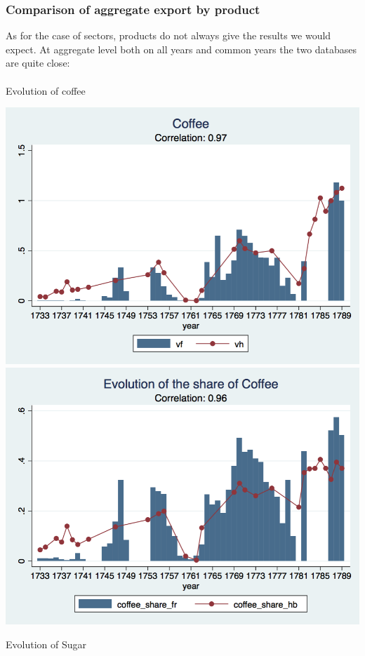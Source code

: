\documentclass[12pt,a4paper,titlepage,english]{article}
\begin{document}
\subsubsection{Comparison of aggregate export by product}
As for the case of sectors, products do not always give the results we would expect. At aggregate level both on all years and common years the two databases are quite close:\\~\\
\caption{Evolution of coffee}
\includegraphics[scale=.28]{coffee_long.png}
\includegraphics[scale=.28]{coffee_share_long.png}\\
\newpage
\caption{Evolution of Sugar}
\end{document}
